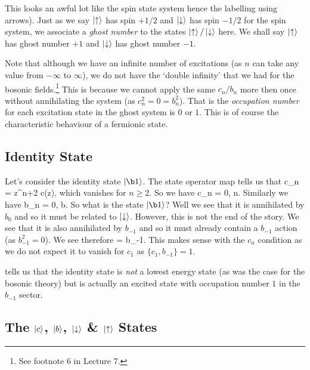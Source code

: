 This looks an awful lot like the spin state system hence the labelling using arrows). Just as we say $\ket{\uparrow}$ has spin $+1/2$ and $\ket{\downarrow}$ has spin $-1/2$ for the spin system, we associate a \textit{ghost number} to the states $\ket{\uparrow}/\ket{\downarrow}$ here. We shall say $\ket{\uparrow}$ has ghost number $+1$ and $\ket{\downarrow}$ has ghost number $-1$. 

\br 
    Note that although we have an infinite number of excitations (as $n$ can take any value from $-\infty$ to $\infty$), we do not have the `double infinity' that we had for the bosonic fields.\footnote{See footnote 6 in Lecture 7.} This is because we cannot apply the same $c_n/b_n$ more then once without annihilating the system (as $c_n^2=0=b_n^2$). That is the \textit{occupation number} for each excitation state in the ghost system is $0$ or $1$. This is of course the characteristic behaviour of a fermionic state. 
\er 

\subsection{Identity State}

Let's consider the identity state $\ket{\b1}$. The state operator map tells us that 
\bse 
    c_n = \oint{} z^{n+2} c(z),
\ese 
which vanishes for $n\geq2$. So we have 
\bse 
    c_n = 0, \qquad \forall n.
\ese 
Similarly we have 
\bse 
    b_n = 0, \qquad \forall b.
\ese 
So what is the state $\ket{\b1}$? Well we see that it is annihilated by $b_0$ and so it must be related to $\ket{\downarrow}$. However, this is not the end of the story. We see that it is also annihilated by $b_{-1}$ and so it must already contain a $b_{-1}$ action (as $b_{-1}^2=0$). We see therefore
\be 
\label{eqn:IdentityStateBC}
     = b_{-1}\ket{\downarrow}.
\ee 
This makes sense with the $c_n$ condition as we do not expect it to vanish for $c_1$ as $\{c_1,b_{-1}\}=1$. 

 tells us that the identity state is \textit{not} a lowest energy state (as was the case for the bosonic theory) but is actually an excited state with occupation number $1$ in the $b_{-1}$ sector. 

\subsection{The $\ket{c}$, $\ket{b}$, $\ket{\downarrow}$ \& $\ket{\uparrow}$ States}

